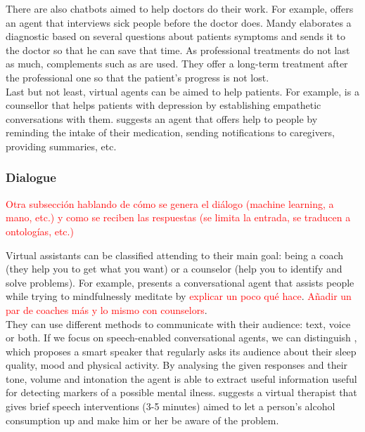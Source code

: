 \documentclass[12pt,english]{article}
\begin{document}
There are also chatbots aimed to help doctors do their work. For example, \cite{Ni201738} offers an agent that interviews sick people before the doctor does. Mandy elaborates a diagnostic based on several questions about patients symptoms and sends it to the doctor so that he can save that time. As professional treatments do not last as much, complements such as \cite{DAlfonso2017} are used. They offer a long-term treatment after the professional one so that the patient's progress is not lost. \\

Last but not least, virtual agents can be aimed to help patients. For example, \cite{Harilal2020349} is a counsellor that helps patients with depression by establishing empathetic conversations with them. \cite{Roca2020954} suggests an agent that offers help to people by reminding the intake of their medication, sending notifications to caregivers, providing summaries, etc.


\subsubsection{Dialogue}

\textcolor{red}{Otra subsección hablando de cómo se genera el diálogo (machine learning, a mano, etc.) y como se reciben las respuestas (se limita la entrada, se traducen a ontologías, etc.)}

Virtual assistants can be classified attending to their main goal: being a coach (they help you to get what you want) or a counselor (help you to identify and solve problems). For example, \cite{HUDLICKA2013160} presents a conversational agent that assists people while trying to mindfulnessly meditate by \textcolor{red}{explicar un poco qué hace}. \textcolor{red}{ Añadir un par de coaches más y lo mismo con counselors}.\\

They can use different methods to communicate with their audience: text, voice or both. If we focus on speech-enabled conversational agents, we can distinguish \cite{Maharjan2019929}, which proposes a smart speaker that regularly asks its audience about their sleep quality, mood and physical activity. By analysing the given responses and their tone, volume and  intonation the agent is able to extract useful information useful for detecting markers of a possible mental ilness. \cite{Yasavur2014381} suggests a virtual therapist that gives brief speech interventions (3-5 minutes) aimed to let a person's alcohol consumption up and make him or her be aware of the problem.\\
\end{document}
